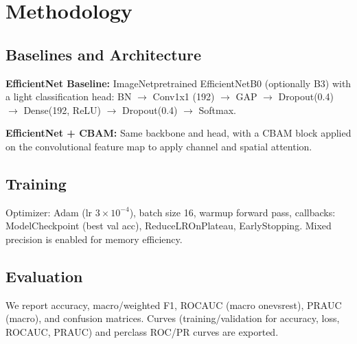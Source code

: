 \chapter{Methodology}
\section{Baselines and Architecture}
\textbf{EfficientNet Baseline:} ImageNet\textendash pretrained EfficientNetB0 (optionally B3) with a light classification head: BN $\rightarrow$ Conv1x1 (192) $\rightarrow$ GAP $\rightarrow$ Dropout(0.4) $\rightarrow$ Dense(192, ReLU) $\rightarrow$ Dropout(0.4) $\rightarrow$ Softmax.

\textbf{EfficientNet + CBAM:} Same backbone and head, with a CBAM block applied on the convolutional feature map to apply channel and spatial attention.

\section{Training}
Optimizer: Adam (lr $3\times10^{-4}$), batch size 16, warm\textendash up forward pass, callbacks: ModelCheckpoint (best val acc), ReduceLROnPlateau, EarlyStopping. Mixed precision is enabled for memory efficiency.

\section{Evaluation}
We report accuracy, macro/weighted F1, ROC\textendash AUC (macro one\textendash vs\textendash rest), PR\textendash AUC (macro), and confusion matrices. Curves (training/validation for accuracy, loss, ROC\textendash AUC, PR\textendash AUC) and per\textendash class ROC/PR curves are exported.

